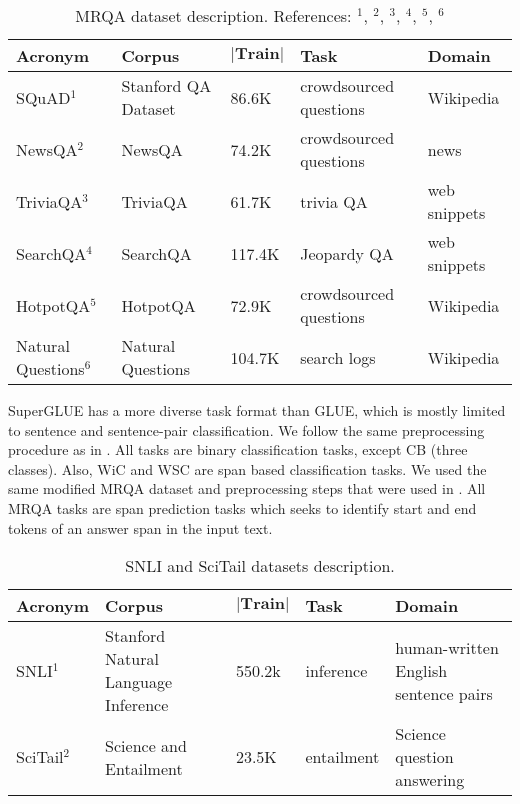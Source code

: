 \documentclass{article} \usepackage{iclr2021_conference,times}
\begin{document}
\begin{table}[H]
\caption{\small MRQA \citep{fisch2019mrqa} dataset description. References: $^1$\cite{squad}, $^2$\citet{newsqa}, $^3$\citet{triviaqa},  $^4$\citet{searchqa}, $^5$\citet{hotpotqa}, $^6$\citet{natq} }
\begin{center}
\footnotesize
\begin{tabular}{|l|l|l|l|l|}
	\hline 
		\textbf{Acronym} & \textbf{Corpus} & $\lvert\textbf{Train}\rvert$ & \textbf{Task} & \textbf{Domain}  \\
		\hline
		SQuAD$^1$             & Stanford QA Dataset & 86.6K  & crowdsourced questions & Wikipedia \\
		NewsQA$^2$            & NewsQA              & 74.2K  & crowdsourced questions & news \\
		TriviaQA$^3$          & TriviaQA            & 61.7K  & trivia QA & web snippets \\
		SearchQA$^4$          & SearchQA            & 117.4K & Jeopardy QA & web snippets \\
		HotpotQA$^5$          & HotpotQA            & 72.9K  & crowdsourced questions & Wikipedia \\
		Natural Questions$^6$ & Natural Questions   & 104.7K & search logs & Wikipedia \\
    \hline
\end{tabular}
\end{center}

\end{table}
SuperGLUE has a more diverse task format than GLUE, which is mostly limited to sentence and sentence-pair classification. We follow the same preprocessing procedure as in \citet{superglue}. All tasks are binary classification tasks, except CB (three classes). Also, WiC and WSC are span based classification tasks. We used the same modified MRQA dataset and preprocessing steps that were used in \citet{DBLP:journals/corr/abs-1907-10529}. All MRQA tasks are span prediction tasks  which seeks to identify start and end tokens of an answer span in the input text.

\begin{table}[H]
\caption{\small SNLI \citep{snli:emnlp2015} and SciTail \citep{Khot2018SciTaiLAT} datasets description.}
\begin{center}
\small
\setlength{\tabcolsep}{2pt}
\begin{tabular}{|l|l|l|l|l|}
	\hline 
		\textbf{Acronym} & \textbf{Corpus} & $\lvert\textbf{Train}\rvert$ & \textbf{Task} & \textbf{Domain}  \\
		\hline
		SNLI$^1$             & Stanford Natural Language Inference & 550.2k  & inference & human-written English sentence pairs \\
		SciTail$^2$            & Science and Entailment              & 23.5K  & entailment & Science question answering \\
    \hline
\end{tabular}
\end{center}
\end{table}
\end{document}
